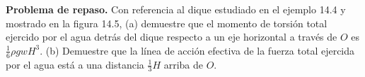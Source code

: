 \item \textbf{Problema de repaso.} Con referencia al dique estudiado en el ejemplo 14.4 y mostrado en la figura 14.5, (a) demuestre que el momento de torsión total ejercido por el agua detrás del dique respecto a un eje horizontal a través de $O$ es $\frac{1}{6} \rho g w H^3$. (b) Demuestre que la línea de acción efectiva de la fuerza total ejercida por el agua está a una distancia $\frac{1}{3} H$ arriba de $O$.
